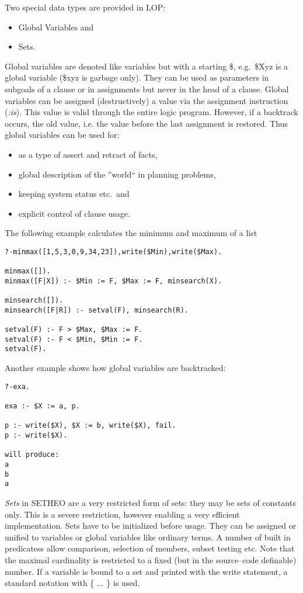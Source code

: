 Two special data types are provided in LOP:
\begin{itemize}
\item Global Variables and
\item Sets.
\end{itemize}

Global variables are denoted like variables but with a starting \$,
e.g.\ \$Xyz is a global variable (\$xyz is garbage only).
They can be used as parameters in subgoals of a clause or in
assignments but never in the head of a clause.
Global variables can be assigned (destructively) a value via
the assignment instruction ({\it :is\/}). This value is valid through
the entire logic program. However, if a backtrack occurs, the old
value, i.e. the value before the last assignment is restored. Thus 
global variables can be used for:
\begin{itemize}
\item
as a type of assert and retract of facts,
\item
global description of the ''world`` in planning problems,
\item
keeping system status etc.\ and
\item
explicit control of clause usage.
\end{itemize}

The following example calculates the minimum and maximum of a list

\begin{verbatim}
?-minmax([1,5,3,0,9,34,23]),write($Min),write($Max).

minmax([]).
minmax([F|X]) :- $Min := F, $Max := F, minsearch(X).

minsearch([]).
minsearch([F|R]) :- setval(F), minsearch(R).

setval(F) :- F > $Max, $Max := F.
setval(F) :- F < $Min, $Min := F.
setval(F).
\end{verbatim}

Another example shows how global variables are backtracked:

\begin{verbatim}
?-exa.

exa :- $X := a, p.

p :- write($X), $X := b, write($X), fail.
p :- write($X).

will produce:
a
b
a
\end{verbatim}


{\it Sets} in SETHEO are a very restricted form of sets:
they may be sets of constants only. This is a severe
restriction, however enabling a very efficient implementation. Sets
have to be initialized before usage. They can be assigned or unified
to variables or global variables like ordinary terms. A number of
built in predicatess allow comparison, selection of members, subset
testing etc. 
Note that the maximal cardinality is restricted to a fixed (but in
the source--code definable)
number.
If a variable is bound to a set and printed with the write statement,
a standard notation with \{ ... \} is used.

